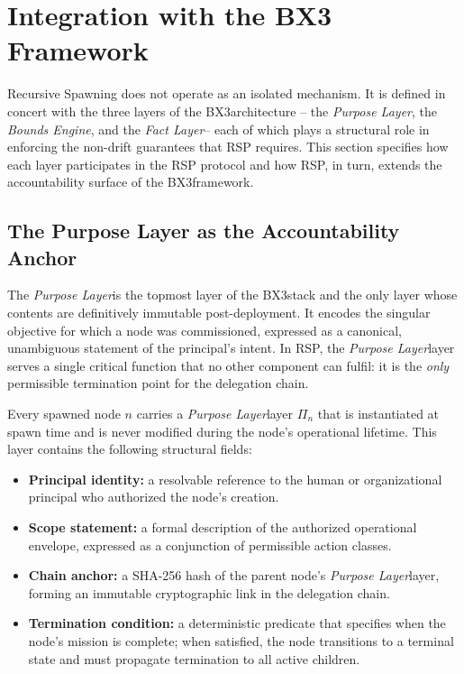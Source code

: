 \documentclass[12pt]{article}
\def\bxthree{BX3}
\def\purpose{\textit{Purpose Layer}}
\def\bounds{\textit{Bounds Engine}}
\def\fact{\textit{Fact Layer}}
\begin{document}
\section{Integration with the BX3 Framework}

Recursive Spawning does not operate as an isolated mechanism. It is defined in concert with the three layers of the \bxthree architecture -- the \purpose, the \bounds, and the \fact -- each of which plays a structural role in enforcing the non-drift guarantees that RSP requires. This section specifies how each layer participates in the RSP protocol and how RSP, in turn, extends the accountability surface of the \bxthree framework.

\subsection{The Purpose Layer as the Accountability Anchor}

The \purpose is the topmost layer of the \bxthree stack and the only layer whose contents are definitively immutable post-deployment. It encodes the singular objective for which a node was commissioned, expressed as a canonical, unambiguous statement of the principal's intent. In RSP, the \purpose layer serves a single critical function that no other component can fulfil: it is the \emph{only} permissible termination point for the delegation chain.

Every spawned node $n$ carries a \purpose layer $\Pi_n$ that is instantiated at spawn time and is never modified during the node's operational lifetime. This layer contains the following structural fields:

\begin{itemize}
    \item \textbf{Principal identity:} a resolvable reference to the human or organizational principal who authorized the node's creation.
    \item \textbf{Scope statement:} a formal description of the authorized operational envelope, expressed as a conjunction of permissible action classes.
    \item \textbf{Chain anchor:} a SHA-256 hash of the parent node's \purpose layer, forming an immutable cryptographic link in the delegation chain.
    \item \textbf{Termination condition:} a deterministic predicate that specifies when the node's mission is complete; when satisfied, the node transitions to a terminal state and must propagate termination to all active children.
\end{itemize}
\end{document}
